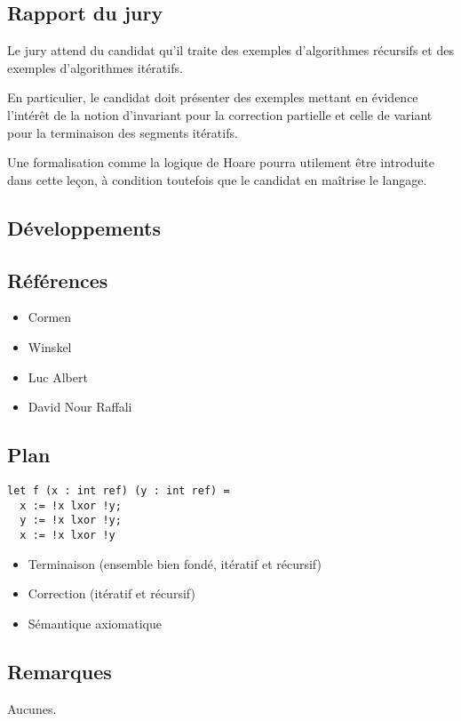 \documentclass[../../agregation.tex]{subfiles}
\begin{document}

\subsection{Rapport du jury}

\begin{aquote}{}
Le jury attend du candidat qu'il traite des exemples d'algorithmes récursifs et des exemples d'algorithmes itératifs.

En particulier, le candidat doit présenter des exemples mettant en évidence l'intérêt de la notion d'invariant pour la correction partielle et celle de variant pour la terminaison des segments itératifs.

Une formalisation comme la logique de Hoare pourra utilement être introduite dans cette leçon, à condition toutefois que le candidat en maîtrise le langage.
\end{aquote}

\subsection{Développements}

\dvts

\subsection{Références}

\begin{itemize}
	\item Cormen
	\item Winskel
	\item Luc Albert
	\item David Nour Raffali
\end{itemize}

\subsection{Plan}

\begin{lstlisting}[language=caml]
let f (x : int ref) (y : int ref) =
  x := !x lxor !y;
  y := !x lxor !y;
  x := !x lxor !y
\end{lstlisting}

\begin{itemize}
	\item Terminaison (ensemble bien fondé, itératif et récursif)
	\item Correction (itératif et récursif)
	\item Sémantique axiomatique
\end{itemize}

\subsection{Remarques}

Aucunes.
\end{document}
